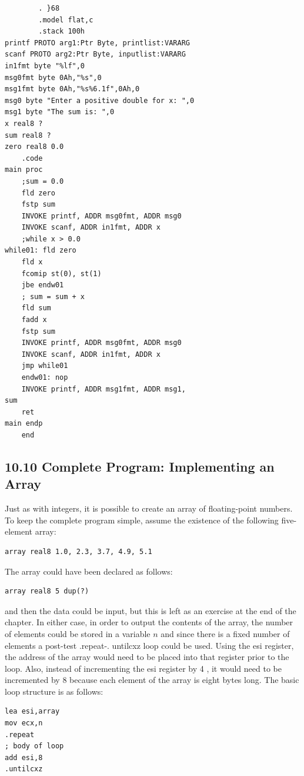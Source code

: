 \documentclass[10pt]{article}
\begin{document}
\begin{verbatim}
        . }68
        .model flat,c
        .stack 100h
printf PROTO arg1:Ptr Byte, printlist:VARARG
scanf PROTO arg2:Ptr Byte, inputlist:VARARG
in1fmt byte "%lf",0
msg0fmt byte 0Ah,"%s",0
msg1fmt byte 0Ah,"%s%6.1f",0Ah,0
msg0 byte "Enter a positive double for x: ",0
msg1 byte "The sum is: ",0
x real8 ?
sum real8 ?
zero real8 0.0
    .code
main proc
    ;sum = 0.0
    fld zero
    fstp sum
    INVOKE printf, ADDR msg0fmt, ADDR msg0
    INVOKE scanf, ADDR in1fmt, ADDR x
    ;while x > 0.0
while01: fld zero
    fld x
    fcomip st(0), st(1)
    jbe endw01
    ; sum = sum + x
    fld sum
    fadd x
    fstp sum
    INVOKE printf, ADDR msg0fmt, ADDR msg0
    INVOKE scanf, ADDR in1fmt, ADDR x
    jmp while01
    endw01: nop
    INVOKE printf, ADDR msg1fmt, ADDR msg1,
sum
    ret
main endp
    end
\end{verbatim}

\subsection*{10.10 Complete Program: Implementing an Array}
Just as with integers, it is possible to create an array of floating-point numbers. To keep the complete program simple, assume the existence of the following five-element array:

\begin{verbatim}
array real8 1.0, 2.3, 3.7, 4.9, 5.1
\end{verbatim}

The array could have been declared as follows:

\begin{verbatim}
array real8 5 dup(?)
\end{verbatim}

and then the data could be input, but this is left as an exercise at the end of the chapter. In either case, in order to output the contents of the array, the number of elements could be stored in a variable $n$ and since there is a fixed number of elements a post-test .repeat-. untilcxz loop could be used. Using the esi register, the address of the array would need to be placed into that register prior to the loop. Also, instead of incrementing the esi register by 4 , it would need to be incremented by 8 because each element of the array is eight bytes long. The basic loop structure is as follows:

\begin{verbatim}
lea esi,array
mov ecx,n
.repeat
; body of loop
add esi,8
.untilcxz
\end{verbatim}
\end{document}
